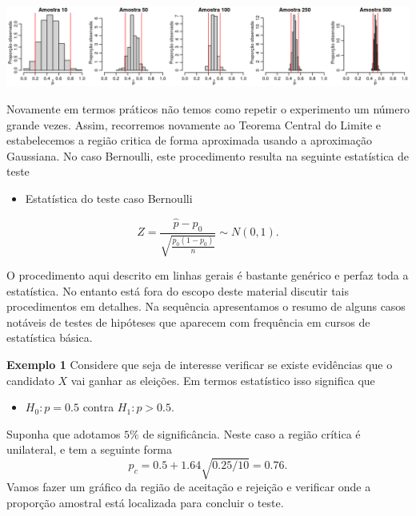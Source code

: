 \documentclass[
  10pt,
  a4paper]{book}
\providecommand{\tightlist}{%
  \setlength{\itemsep}{0pt}\setlength{\parskip}{0pt}}
\begin{document}
\begin{center}\includegraphics[width=0.99\linewidth]{figures/unnamed-chunk-389-1} \end{center}

Novamente em termos práticos não temos como repetir o experimento um número grande vezes. Assim, recorremos novamente ao Teorema Central do Limite e estabelecemos a região critica de forma aproximada usando a aproximação Gaussiana. No caso Bernoulli, este procedimento resulta na seguinte estatística de teste

\begin{itemize}
\tightlist
\item
  Estatística do teste caso Bernoulli
\end{itemize}

\[
Z = \frac{\hat{p} - p_0}{\sqrt{\frac{p_0(1-p_0)}{n}}} \sim N(0,1).
\]

O procedimento aqui descrito em linhas gerais é bastante genérico e perfaz toda a estatística. No entanto está fora do escopo deste material discutir tais procedimentos em detalhes. Na sequência apresentamos o resumo de alguns casos notáveis de testes de hipóteses que aparecem com frequência em cursos de estatística básica.

\textbf{Exemplo 1} Considere que seja de interesse verificar se existe evidências que o candidato \(X\) vai ganhar as eleições. Em termos estatístico isso significa que

\begin{itemize}
\tightlist
\item
  \(H_0: p = 0.5\) contra \(H_1:p > 0.5.\)
\end{itemize}

Suponha que adotamos \(5\%\) de significância.
Neste caso a região crítica é unilateral, e tem a seguinte forma
\[p_c = 0.5 + 1.64\sqrt{0.25/10} = 0.76.\]
Vamos fazer um gráfico da região de aceitação e rejeição e verificar onde a proporção amostral está localizada para concluir o teste.
\end{document}
